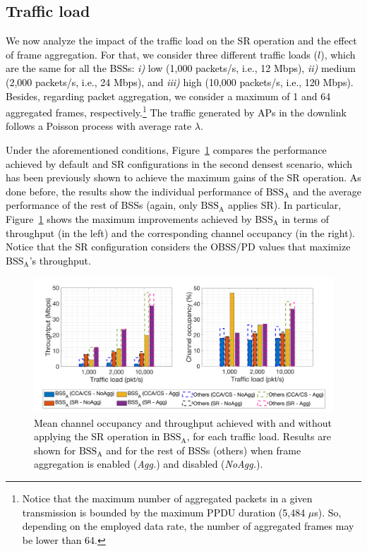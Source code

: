 \documentclass[preprint,12pt]{elsarticle}
\theoremstyle{plain}
\begin{document}
\subsection{Traffic load}
\label{section:random_scenarios_traffic_load}
\textcolor{black}{We now analyze the impact of the traffic load on the SR operation and the effect of frame aggregation. For that, we consider three different traffic loads ($l$), which are the same for all the BSSs: \emph{i)} low (1,000 packets/s, i.e., 12 Mbps), \emph{ii)} medium (2,000 packets/s, i.e., 24 Mbps), and \emph{iii)} high (10,000 packets/s, i.e., 120 Mbps). Besides, regarding packet aggregation, we consider a maximum of 1 and 64 aggregated frames, respectively.\footnote{\textcolor{black}{Notice that the maximum number of aggregated packets in a given transmission is bounded by the maximum PPDU duration (5,484 $\mu$s). So, depending on the employed data rate, the number of aggregated frames may be lower than 64.}} The traffic generated by APs in the downlink follows a Poisson process with average rate $\lambda$.}

\textcolor{black}{Under the aforementioned conditions, Figure~\ref{fig:SIM_2_2} compares the performance achieved by default and SR configurations in the second densest scenario, which has been previously shown to achieve the maximum gains of the SR operation. As done before, the results show the individual performance of $\text{BSS}_\text{A}$ and the average performance of the rest of BSSs (again, only $\text{BSS}_\text{A}$ applies SR). In particular, Figure~\ref{fig:SIM_2_2} shows the maximum improvements achieved by BSS$_\text{A}$ in terms of throughput (in the left) and the corresponding channel occupancy (in the right). Notice that the SR configuration considers the OBSS/PD values that maximize BSS$_\text{A}$'s throughput.}

\begin{figure}[ht!]
	\centering		
	\includegraphics[width=.9\columnwidth]{SIM_2_2_NEW}	
	\caption{\textcolor{black}{Mean channel occupancy and throughput achieved with and without applying the SR operation in $\text{BSS}_\text{A}$, for each traffic load. Results are shown for $\text{BSS}_\text{A}$ and for the rest of BSSs (others) when frame aggregation is enabled (\textit{Agg.}) and disabled (\textit{NoAgg.}).}}
	\label{fig:SIM_2_2}
\end{figure}
\end{document}
